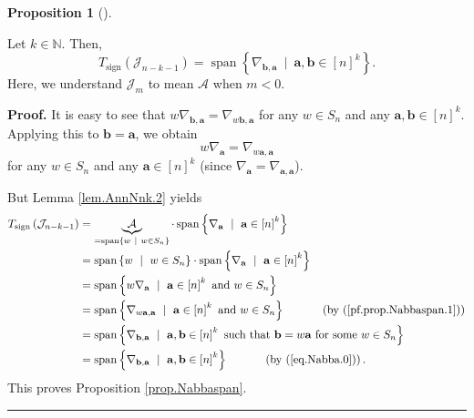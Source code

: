 \documentclass[numbers=enddot,12pt,final,onecolumn,notitlepage]{scrartcl}%
\numberwithin{exer}{subsection}
\theoremstyle{definition}
\newtheorem{prop}[theo]{Proposition}
\newenvironment{proposition}[1][]
{\begin{prop}[#1]\begin{leftbar}}
{\end{leftbar}\end{prop}}
\newenvironment{proof}[1][Proof]{\noindent\textbf{#1.} }{\ \rule{0.5em}{0.5em}}
\begin{document}
\begin{proposition}
\label{prop.Nabbaspan}Let $k\in\mathbb{N}$. Then,
\[
T_{\operatorname*{sign}}\left(  \mathcal{J}_{n-k-1}\right)
=\operatorname*{span}\left\{  \nabla_{\mathbf{b},\mathbf{a}}\ \mid
\ \mathbf{a},\mathbf{b}\in\left[  n\right]  ^{k}\right\}  .
\]
Here, we understand $\mathcal{J}_{m}$ to mean $\mathcal{A}$ when $m<0$.
\end{proposition}

\begin{proof}
It is easy to see that $w\nabla_{\mathbf{b},\mathbf{a}}=\nabla_{w\mathbf{b}%
,\mathbf{a}}$ for any $w\in S_{n}$ and any $\mathbf{a},\mathbf{b}\in\left[
n\right]  ^{k}$. Applying this to $\mathbf{b}=\mathbf{a}$, we obtain
\begin{equation}
w\nabla_{\mathbf{a}}=\nabla_{w\mathbf{a},\mathbf{a}}
\label{pf.prop.Nabbaspan.1}%
\end{equation}
for any $w\in S_{n}$ and any $\mathbf{a}\in\left[  n\right]  ^{k}$ (since
$\nabla_{\mathbf{a}}=\nabla_{\mathbf{a},\mathbf{a}}$).

But Lemma \ref{lem.AnnNnk.2} yields%
\begin{align*}
T_{\operatorname*{sign}}\left(  \mathcal{J}_{n-k-1}\right)   &
=\underbrace{\mathcal{A}}_{=\operatorname*{span}\left\{  w\ \mid\ w\in
S_{n}\right\}  }\cdot\operatorname*{span}\left\{  \nabla_{\mathbf{a}}%
\ \mid\ \mathbf{a}\in\left[  n\right]  ^{k}\right\} \\
&  =\operatorname*{span}\left\{  w\ \mid\ w\in S_{n}\right\}  \cdot
\operatorname*{span}\left\{  \nabla_{\mathbf{a}}\ \mid\ \mathbf{a}\in\left[
n\right]  ^{k}\right\} \\
&  =\operatorname*{span}\left\{  w\nabla_{\mathbf{a}}\ \mid\ \mathbf{a}%
\in\left[  n\right]  ^{k}\text{ and }w\in S_{n}\right\} \\
&  =\operatorname*{span}\left\{  \nabla_{w\mathbf{a},\mathbf{a}}%
\ \mid\ \mathbf{a}\in\left[  n\right]  ^{k}\text{ and }w\in S_{n}\right\}
\ \ \ \ \ \ \ \ \ \ \left(  \text{by (\ref{pf.prop.Nabbaspan.1})}\right) \\
&  =\operatorname*{span}\left\{  \nabla_{\mathbf{b},\mathbf{a}}\ \mid
\ \mathbf{a},\mathbf{b}\in\left[  n\right]  ^{k}\text{ such that }%
\mathbf{b}=w\mathbf{a}\text{ for some }w\in S_{n}\right\} \\
&  =\operatorname*{span}\left\{  \nabla_{\mathbf{b},\mathbf{a}}\ \mid
\ \mathbf{a},\mathbf{b}\in\left[  n\right]  ^{k}\right\}
\ \ \ \ \ \ \ \ \ \ \left(  \text{by (\ref{eq.Nabba.0})}\right)  .
\end{align*}
This proves Proposition \ref{prop.Nabbaspan}.
\end{proof}
\end{document}
